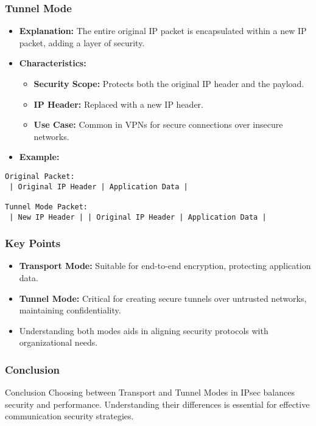 \documentclass{beamer}
\begin{document}
\begin{frame}[fragile]
    \frametitle{Tunnel Mode}
    \begin{itemize}
        \item \textbf{Explanation:} The entire original IP packet is encapsulated within a new IP packet, adding a layer of security.
        \item \textbf{Characteristics:}
            \begin{itemize}
                \item \textbf{Security Scope:} Protects both the original IP header and the payload.
                \item \textbf{IP Header:} Replaced with a new IP header.
                \item \textbf{Use Case:} Common in VPNs for secure connections over insecure networks.
            \end{itemize}
        \item \textbf{Example:}
    \end{itemize}
    \begin{lstlisting}
Original Packet:
 | Original IP Header | Application Data |

Tunnel Mode Packet:
 | New IP Header | | Original IP Header | Application Data |
    \end{lstlisting}
\end{frame}

\begin{frame}[fragile]
    \frametitle{Key Points}
    \begin{itemize}
        \item \textbf{Transport Mode:} Suitable for end-to-end encryption, protecting application data.
        \item \textbf{Tunnel Mode:} Critical for creating secure tunnels over untrusted networks, maintaining confidentiality.
        \item Understanding both modes aids in aligning security protocols with organizational needs.
    \end{itemize}
\end{frame}

\begin{frame}[fragile]
    \frametitle{Conclusion}
    \begin{block}{Conclusion}
        Choosing between Transport and Tunnel Modes in IPsec balances security and performance. Understanding their differences is essential for effective communication security strategies.
    \end{block}
\end{frame}
\end{document}
